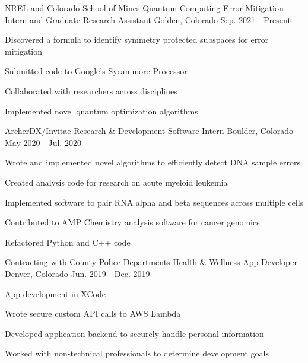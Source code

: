 


\begin{cventries}

  \cventry
    {NREL and Colorado School of Mines}
    {Quantum Computing Error Mitigation Intern and Graduate Research Assistant}
    {Golden, Colorado}
    {Sep. 2021 - Present}
    {
      \begin{cvitems}
        \item{Discovered a formula to identify symmetry protected subspaces for error mitigation}
        \item{Submitted code to Google's Sycammore Processor}
        \item{Collaborated with researchers across disciplines}
        \item{Implemented novel quantum optimization algorithms}
      \end{cvitems}
    }

  \cventry
    {ArcherDX/Invitae}
    {Research \& Development Software Intern}
    {Boulder, Colorado}
    {May 2020 - Jul. 2020}
    {
      \begin{cvitems}
        \item{Wrote and implemented novel algorithms to efficiently detect DNA sample errors}
        \item{Created analysis code for research on acute myeloid leukemia}
        \item{Implemented software to pair RNA alpha and beta sequences across multiple cells}
        \item{Contributed to AMP Chemistry analysis software for cancer genomics}
        \item{Refactored Python and C++ code}
      \end{cvitems}
    }

  \cventry
    {Contracting with County Police Departments} %
    {Health \& Wellness App Developer} %
    {Denver, Colorado} %
    {Jun. 2019 - Dec. 2019} %
    {
      \begin{cvitems} %
        \item {App development in XCode}
        \item {Wrote secure custom API calls to AWS Lambda}
        \item {Developed application backend to securely handle personal information}
        \item {Worked with non-technical professionals to determine development goals}
      \end{cvitems}
    }


\end{cventries}
